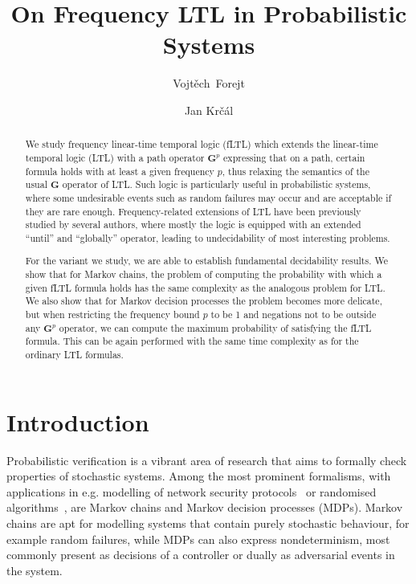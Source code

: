 \documentclass[a4paper,UKenglish]{lipics}
\newcommand{\Gf}[1]{\mathbf{G}^{#1}}
\begin{document}
\title{On Frequency LTL in Probabilistic Systems}

\author[1]{Vojt\v{e}ch~Forejt}
\author[2]{Jan Kr\v{c}\'al}





\maketitle

\begin{abstract}
We study frequency linear-time temporal logic (fLTL) which extends the
linear-time temporal logic (LTL) with a path operator $\Gf{p}$
expressing that on a path, certain formula holds with at least a given frequency $p$, thus relaxing
the semantics of the usual $\mathbf{G}$ operator of LTL. Such logic is particularly useful
in probabilistic systems, where some undesirable events such as random failures may occur
and are acceptable if they are rare enough.
Frequency-related extensions of LTL have been previously studied by several authors, where mostly
the logic is equipped with an extended ``until'' and ``globally'' operator, leading to undecidability
of most interesting problems. 

For the variant we study, we are able to establish fundamental decidability results. We show that for Markov chains,
the problem of computing the probability with which a given fLTL formula holds has the same complexity
as the analogous problem for LTL. We also show that for Markov decision processes the problem becomes
more delicate, but when restricting the frequency bound $p$ to be 1 and negations not to be outside any $\mathbf{G}^p$ operator, we can
compute the maximum probability of satisfying the fLTL formula. This can be again performed with the same time
complexity as for the ordinary LTL formulas.
\end{abstract}

\section{Introduction}

Probabilistic verification is a vibrant area of research that aims to formally check properties of stochastic systems. Among the most
prominent formalisms, with applications in e.g. modelling of network security protocols~\cite{Shm04} or
randomised algorithms~\cite{KNP12a}, are Markov chains and Markov decision processes (MDPs). Markov chains are
apt for modelling systems that contain 
purely stochastic behaviour,
for example random failures,
while MDPs can also express nondeterminism,
most commonly present as decisions of a controller or dually as adversarial events in the system.
\end{document}
